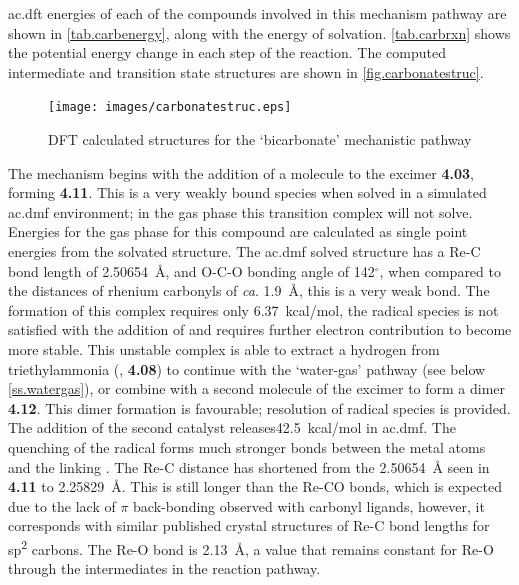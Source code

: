 \Gls{ac.dft} energies of each of the compounds involved in this mechanism pathway are shown in \autoref{tab.carbenergy}, along with the energy of solvation. \autoref{tab.carbrxn} shows the potential energy change in each step of the reaction. The computed intermediate and transition state structures are shown in \autoref{fig.carbonatestruc}. 




\begin{figure}[!htb]
 \begin{center}
  \texttt{[image: images/carbonatestruc.eps]}
 \end{center}
\caption{DFT calculated structures for the `bicarbonate' mechanistic pathway}
\label{fig.carbonatestruc}
\end{figure} 

The mechanism begins with the addition of a  molecule to the excimer \textbf{4.03}, forming \textbf{4.11}. This is a very weakly bound species when solved in a simulated \gls{ac.dmf} environment; in the gas phase this transition complex will not solve. Energies for the gas phase for this compound are calculated as single point energies from the solvated structure. The \gls{ac.dmf} solved structure has a Re-C bond length of 2.50654~\r{A}, and O-C-O bonding angle of 142$^\circ$, when compared to the  distances of rhenium carbonyls of \textit{ca}. 1.9~\r{A}, this is a very weak bond. The formation of this complex requires only 6.37~kcal/mol, the radical species is not satisfied with the addition of  and requires further electron contribution to become more stable. This unstable complex is able to extract a hydrogen from triethylammonia (, \textbf{4.08}) to continue with the `water-gas' pathway (see below \autoref{ss.watergas}), or combine with a second molecule of the excimer to form a dimer \textbf{4.12}. This dimer formation is favourable; resolution of radical species is provided. The addition of the second catalyst releases42.5~kcal/mol in \gls{ac.dmf}. The quenching of the radical forms much stronger bonds between the metal atoms and the linking . The Re-C distance has shortened from the 2.50654~\r{A} seen in \textbf{4.11} to 2.25829~\r{A}. This is still longer than the Re-CO bonds, which is expected due to the lack of $\pi$ back-bonding observed with carbonyl ligands, however, it corresponds with similar published crystal structures of Re-C bond lengths for sp\textsuperscript{2} carbons\autocite{lukehart1977}. The Re-O bond is 2.13~\r{A}, a value that remains constant for Re-O through the intermediates in the reaction pathway.


